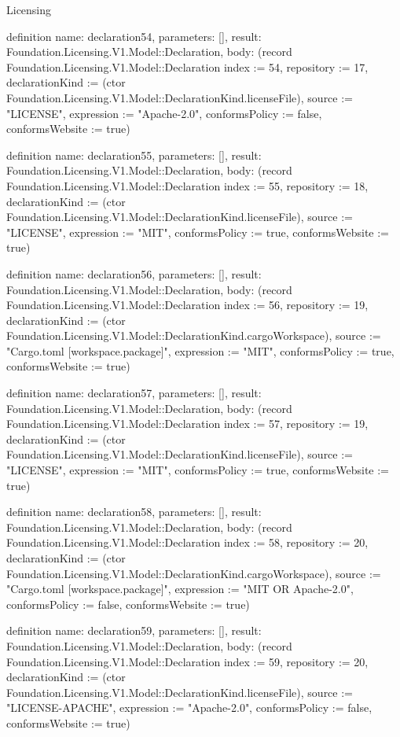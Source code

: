 \begin{lexlean}{Licensing}
\begin{semanticmodule}
definition{
  name: declaration54,
  parameters: [],
  result: Foundation.Licensing.V1.Model::Declaration,
  body: (record Foundation.Licensing.V1.Model::Declaration {index := 54, repository := 17, declarationKind := (ctor Foundation.Licensing.V1.Model::DeclarationKind.licenseFile), source := "LICENSE", expression := "Apache-2.0", conformsPolicy := false, conformsWebsite := true})
}

definition{
  name: declaration55,
  parameters: [],
  result: Foundation.Licensing.V1.Model::Declaration,
  body: (record Foundation.Licensing.V1.Model::Declaration {index := 55, repository := 18, declarationKind := (ctor Foundation.Licensing.V1.Model::DeclarationKind.licenseFile), source := "LICENSE", expression := "MIT", conformsPolicy := true, conformsWebsite := true})
}

definition{
  name: declaration56,
  parameters: [],
  result: Foundation.Licensing.V1.Model::Declaration,
  body: (record Foundation.Licensing.V1.Model::Declaration {index := 56, repository := 19, declarationKind := (ctor Foundation.Licensing.V1.Model::DeclarationKind.cargoWorkspace), source := "Cargo.toml [workspace.package]", expression := "MIT", conformsPolicy := true, conformsWebsite := true})
}

definition{
  name: declaration57,
  parameters: [],
  result: Foundation.Licensing.V1.Model::Declaration,
  body: (record Foundation.Licensing.V1.Model::Declaration {index := 57, repository := 19, declarationKind := (ctor Foundation.Licensing.V1.Model::DeclarationKind.licenseFile), source := "LICENSE", expression := "MIT", conformsPolicy := true, conformsWebsite := true})
}

definition{
  name: declaration58,
  parameters: [],
  result: Foundation.Licensing.V1.Model::Declaration,
  body: (record Foundation.Licensing.V1.Model::Declaration {index := 58, repository := 20, declarationKind := (ctor Foundation.Licensing.V1.Model::DeclarationKind.cargoWorkspace), source := "Cargo.toml [workspace.package]", expression := "MIT OR Apache-2.0", conformsPolicy := false, conformsWebsite := true})
}

definition{
  name: declaration59,
  parameters: [],
  result: Foundation.Licensing.V1.Model::Declaration,
  body: (record Foundation.Licensing.V1.Model::Declaration {index := 59, repository := 20, declarationKind := (ctor Foundation.Licensing.V1.Model::DeclarationKind.licenseFile), source := "LICENSE-APACHE", expression := "Apache-2.0", conformsPolicy := false, conformsWebsite := true})
}


\end{semanticmodule}
\end{lexlean}
